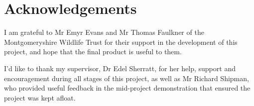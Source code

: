 \thispagestyle{empty}


\section*{\centering Acknowledgements}


I am grateful to Mr Emyr Evans and Mr Thomas Faulkner of the Montgomeryshire Wildlife Trust for their support in the development of this project, and hope that the final product is useful to them.

I'd like to thank my supervisor, Dr Edel Sherratt, for her help, support and encouragement during all stages of this project, as well as Mr Richard Shipman, who provided useful feedback in the mid-project demonstration that ensured the project was kept afloat.

